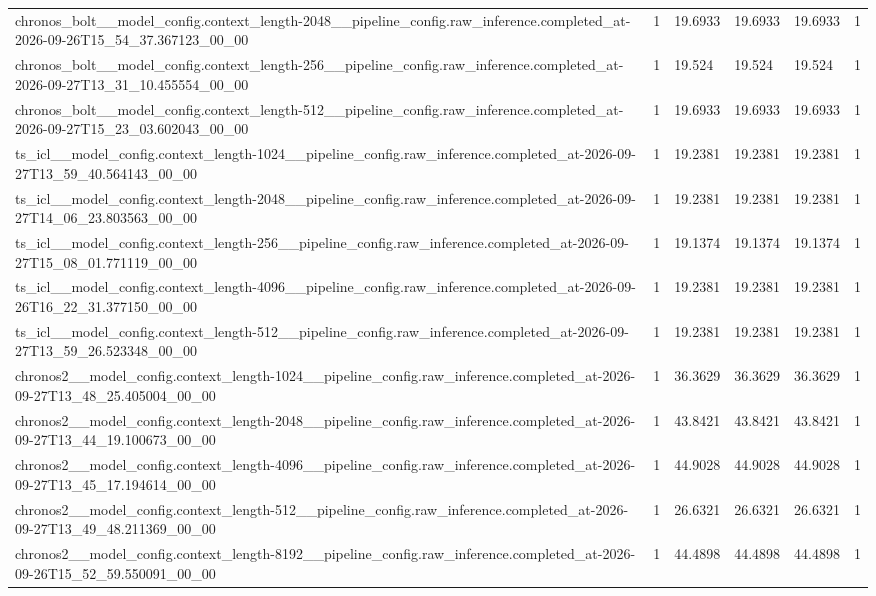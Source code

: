 \begin{tabular}{llllll}
chronos\_bolt\_\_model\_config.context\_length-2048\_\_pipeline\_config.raw\_inference.completed\_at-2026-09-26T15\_54\_37.367123\_00\_00 & 1 & 19.6933 & 19.6933 & 19.6933 & 1 \\
chronos\_bolt\_\_model\_config.context\_length-256\_\_pipeline\_config.raw\_inference.completed\_at-2026-09-27T13\_31\_10.455554\_00\_00 & 1 & 19.524 & 19.524 & 19.524 & 1 \\
chronos\_bolt\_\_model\_config.context\_length-512\_\_pipeline\_config.raw\_inference.completed\_at-2026-09-27T15\_23\_03.602043\_00\_00 & 1 & 19.6933 & 19.6933 & 19.6933 & 1 \\
ts\_icl\_\_model\_config.context\_length-1024\_\_pipeline\_config.raw\_inference.completed\_at-2026-09-27T13\_59\_40.564143\_00\_00 & 1 & 19.2381 & 19.2381 & 19.2381 & 1 \\
ts\_icl\_\_model\_config.context\_length-2048\_\_pipeline\_config.raw\_inference.completed\_at-2026-09-27T14\_06\_23.803563\_00\_00 & 1 & 19.2381 & 19.2381 & 19.2381 & 1 \\
ts\_icl\_\_model\_config.context\_length-256\_\_pipeline\_config.raw\_inference.completed\_at-2026-09-27T15\_08\_01.771119\_00\_00 & 1 & 19.1374 & 19.1374 & 19.1374 & 1 \\
ts\_icl\_\_model\_config.context\_length-4096\_\_pipeline\_config.raw\_inference.completed\_at-2026-09-26T16\_22\_31.377150\_00\_00 & 1 & 19.2381 & 19.2381 & 19.2381 & 1 \\
ts\_icl\_\_model\_config.context\_length-512\_\_pipeline\_config.raw\_inference.completed\_at-2026-09-27T13\_59\_26.523348\_00\_00 & 1 & 19.2381 & 19.2381 & 19.2381 & 1 \\
chronos2\_\_model\_config.context\_length-1024\_\_pipeline\_config.raw\_inference.completed\_at-2026-09-27T13\_48\_25.405004\_00\_00 & 1 & 36.3629 & 36.3629 & 36.3629 & 1 \\
chronos2\_\_model\_config.context\_length-2048\_\_pipeline\_config.raw\_inference.completed\_at-2026-09-27T13\_44\_19.100673\_00\_00 & 1 & 43.8421 & 43.8421 & 43.8421 & 1 \\
chronos2\_\_model\_config.context\_length-4096\_\_pipeline\_config.raw\_inference.completed\_at-2026-09-27T13\_45\_17.194614\_00\_00 & 1 & 44.9028 & 44.9028 & 44.9028 & 1 \\
chronos2\_\_model\_config.context\_length-512\_\_pipeline\_config.raw\_inference.completed\_at-2026-09-27T13\_49\_48.211369\_00\_00 & 1 & 26.6321 & 26.6321 & 26.6321 & 1 \\
chronos2\_\_model\_config.context\_length-8192\_\_pipeline\_config.raw\_inference.completed\_at-2026-09-26T15\_52\_59.550091\_00\_00 & 1 & 44.4898 & 44.4898 & 44.4898 & 1 \\

\end{tabular}
